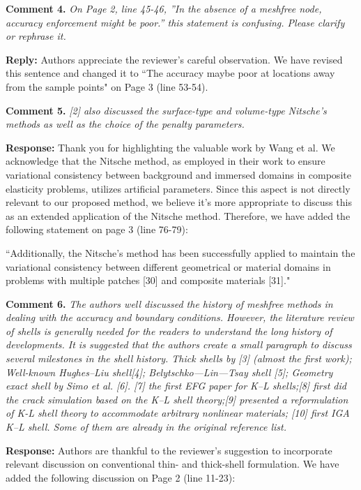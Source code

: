\documentclass{article}
\begin{document}
\textbf{Comment 4.} \textit{On Page 2, line 45-46, ”In the absence of a meshfree node, accuracy enforcement might be poor.” this statement is confusing. Please clarify or rephrase it.}

\textbf{Reply:} Authors appreciate the reviewer's careful observation. We have revised this sentence and changed it to ``The accuracy maybe poor at locations away from the sample points" on Page 3 (line 53-54).

\textbf{Comment 5.} \textit{[2] also discussed the surface-type and volume-type Nitsche’s methods as well as the choice of the penalty parameters.}

\textbf{Response:} Thank you for highlighting the valuable work by Wang et al. We acknowledge that the Nitsche method, as employed in their work to ensure variational consistency between background and immersed domains in composite elasticity problems, utilizes artificial parameters. Since this aspect is not directly relevant to our proposed method, we believe it's more appropriate to discuss this as an extended application of the Nitsche method.
Therefore, we have added the following statement on page 3 (line 76-79):

``Additionally, the Nitsche's method has been successfully applied to maintain the variational consistency between different geometrical or material domains in problems with multiple patches [30] and composite materials [31]."
 
\textbf{Comment 6.} \textit{The authors well discussed the history of meshfree methods in dealing with the accuracy and boundary conditions. However, the literature review of shells is generally needed for the readers to understand the long history of developments. It is suggested that the authors create a small paragraph to discuss several milestones in the shell history. Thick shells by [3] (almost the first work); Well-known Hughes–Liu shell[4]; Belytschko—Lin—Tsay shell [5]; Geometry exact shell by Simo et al. [6]. [7] the first EFG paper for K–L shells;[8] first did the crack simulation based on the K–L shell theory;[9] presented a reformulation of K-L shell theory to accommodate arbitrary nonlinear materials; [10] first IGA K–L shell. Some of them are already in the original reference list.}

\textbf{Response:} Authors are thankful to the reviewer's suggestion to incorporate relevant discussion on conventional thin- and thick-shell formulation. We have added the following discussion on Page 2 (line 11-23): 
\end{document}
